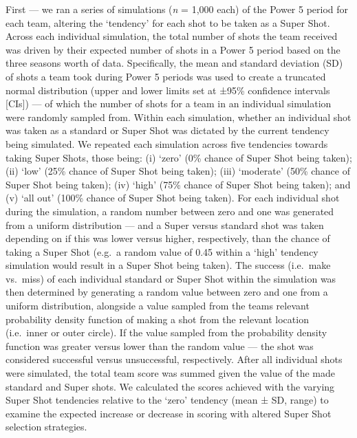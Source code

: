 \documentclass[]{elsarticle} %
\begin{document}
First --- we ran a series of simulations (\emph{n} = 1,000 each) of the
Power 5 period for each team, altering the `tendency' for each shot to
be taken as a Super Shot. Across each individual simulation, the total
number of shots the team received was driven by their expected number of
shots in a Power 5 period based on the three seasons worth of data.
Specifically, the mean and standard deviation (SD) of shots a team took
during Power 5 periods was used to create a truncated normal
distribution (upper and lower limits set at ±95\% confidence intervals
{[}CIs{]}) --- of which the number of shots for a team in an individual
simulation were randomly sampled from. Within each simulation, whether
an individual shot was taken as a standard or Super Shot was dictated by
the current tendency being simulated. We repeated each simulation across
five tendencies towards taking Super Shots, those being: (i) `zero' (0\%
chance of Super Shot being taken); (ii) `low' (25\% chance of Super Shot
being taken); (iii) `moderate' (50\% chance of Super Shot being taken);
(iv) `high' (75\% chance of Super Shot being taken); and (v) `all out'
(100\% chance of Super Shot being taken). For each individual shot
during the simulation, a random number between zero and one was
generated from a uniform distribution --- and a Super versus standard
shot was taken depending on if this was lower versus higher,
respectively, than the chance of taking a Super Shot (e.g.~a random
value of 0.45 within a `high' tendency simulation would result in a
Super Shot being taken). The success (i.e.~make vs.~miss) of each
individual standard or Super Shot within the simulation was then
determined by generating a random value between zero and one from a
uniform distribution, alongside a value sampled from the teams relevant
probability density function of making a shot from the relevant location
(i.e.~inner or outer circle). If the value sampled from the probability
density function was greater versus lower than the random value --- the
shot was considered successful versus unsuccessful, respectively. After
all individual shots were simulated, the total team score was summed
given the value of the made standard and Super shots. We calculated the
scores achieved with the varying Super Shot tendencies relative to the
`zero' tendency (mean ± SD, range) to examine the expected increase or
decrease in scoring with altered Super Shot selection strategies.
\end{document}
